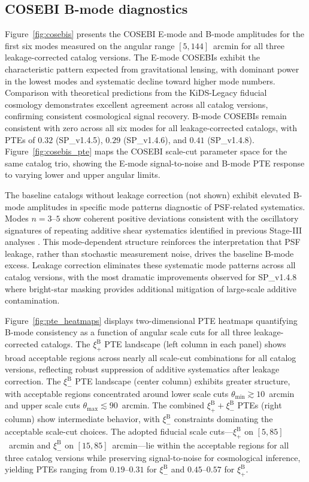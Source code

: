\documentclass{aa}
\begin{document}
\subsection{COSEBI B-mode diagnostics}

Figure~\ref{fig:cosebis} presents the COSEBI E-mode and B-mode amplitudes for the first six modes measured on the angular range $[5, 144]$~arcmin for all three leakage-corrected catalog versions. The E-mode COSEBIs exhibit the characteristic pattern expected from gravitational lensing, with dominant power in the lowest modes and systematic decline toward higher mode numbers. Comparison with theoretical predictions from the KiDS-Legacy fiducial cosmology demonstrates excellent agreement across all catalog versions, confirming consistent cosmological signal recovery. B-mode COSEBIs remain consistent with zero across all six modes for all leakage-corrected catalogs, with PTEs of $0.32$ (SP\_v1.4.5), $0.29$ (SP\_v1.4.6), and $0.41$ (SP\_v1.4.8). Figure~\ref{fig:cosebis_pte} maps the COSEBI scale-cut parameter space for the same catalog trio, showing the E-mode signal-to-noise and B-mode PTE response to varying lower and upper angular limits.

The baseline catalogs without leakage correction (not shown) exhibit elevated B-mode amplitudes in specific mode patterns diagnostic of PSF-related systematics. Modes $n = 3$--$5$ show coherent positive deviations consistent with the oscillatory signatures of repeating additive shear systematics identified in previous Stage-III analyses \citep{asgari.etal20}. This mode-dependent structure reinforces the interpretation that PSF leakage, rather than stochastic measurement noise, drives the baseline B-mode excess. Leakage correction eliminates these systematic mode patterns across all catalog versions, with the most dramatic improvements observed for SP\_v1.4.8 where bright-star masking provides additional mitigation of large-scale additive contamination.

Figure~\ref{fig:pte_heatmaps} displays two-dimensional PTE heatmaps quantifying B-mode consistency as a function of angular scale cuts for all three leakage-corrected catalogs. The $\xi_+^{\mathrm{B}}$ PTE landscape (left column in each panel) shows broad acceptable regions across nearly all scale-cut combinations for all catalog versions, reflecting robust suppression of additive systematics after leakage correction. The $\xi_-^{\mathrm{B}}$ PTE landscape (center column) exhibits greater structure, with acceptable regions concentrated around lower scale cuts $\theta_{\mathrm{min}} \gtrsim 10$~arcmin and upper scale cuts $\theta_{\mathrm{max}} \lesssim 90$~arcmin. The combined $\xi_+^{\mathrm{B}} + \xi_-^{\mathrm{B}}$ PTEs (right column) show intermediate behavior, with $\xi_-^{\mathrm{B}}$ constraints dominating the acceptable scale-cut choices. The adopted fiducial scale cuts—$\xi_+^{\mathrm{B}}$ on $[5, 85]$~arcmin and $\xi_-^{\mathrm{B}}$ on $[15, 85]$~arcmin—lie within the acceptable regions for all three catalog versions while preserving signal-to-noise for cosmological inference, yielding PTEs ranging from $0.19$--$0.31$ for $\xi_-^{\mathrm{B}}$ and $0.45$--$0.57$ for $\xi_+^{\mathrm{B}}$.
\end{document}
